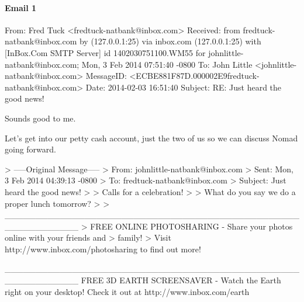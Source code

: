 \paragraph{Email 1}
\label{MailNomad1}
\begin{spverbatim}
From: Fred Tuck <fredtuck-natbank@inbox.com>
Received: from fredtuck-natbank@inbox.com by (127.0.0.1:25) via inbox.com
  (127.0.0.1:25) with [InBox.Com SMTP Server] id 1402030751100.WM55 for
  johnlittle-natbank@inbox.com; Mon, 3 Feb 2014 07:51:40 -0800
To: John Little <johnlittle-natbank@inbox.com>
MessageID: <ECBE881F87D.000002E9fredtuck-natbank@inbox.com>
Date: 2014-02-03 16:51:40
Subject: RE: Just heard the good news!

Sounds good to me.

Let's get into our petty cash account, just the two of us so we can discuss Nomad going forward.

> -----Original Message-----
> From: johnlittle-natbank@inbox.com
> Sent: Mon, 3 Feb 2014 04:39:13 -0800
> To: fredtuck-natbank@inbox.com
> Subject: Just heard the good news!
> 
> Calls for a celebration!
> 
> What do you say we do a proper lunch tomorrow?
> 
> ____________________________________________________________
> FREE ONLINE PHOTOSHARING - Share your photos online with your friends and
> family!
> Visit http://www.inbox.com/photosharing to find out more!

____________________________________________________________
FREE 3D EARTH SCREENSAVER - Watch the Earth right on your desktop!
Check it out at http://www.inbox.com/earth


\end{spverbatim}

